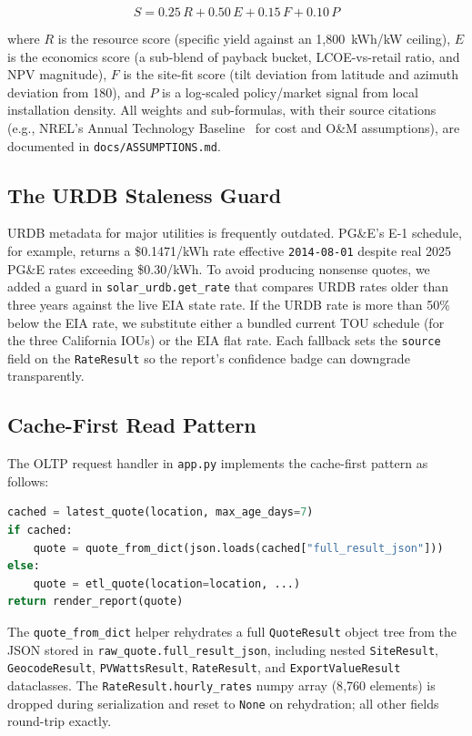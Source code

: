 \documentclass[10pt, conference]{IEEEtran}
\begin{document}
\begin{equation}
S = 0.25\,R + 0.50\,E + 0.15\,F + 0.10\,P
\end{equation}

where $R$ is the resource score (specific yield against an 1{,}800~kWh/kW ceiling), $E$ is the economics score (a sub-blend of payback bucket, LCOE-vs-retail ratio, and NPV magnitude), $F$ is the site-fit score (tilt deviation from latitude and azimuth deviation from 180\degree), and $P$ is a log-scaled policy/market signal from local installation density. All weights and sub-formulas, with their source citations (e.g., NREL's Annual Technology Baseline~\cite{NRELATB} for cost and O\&M assumptions), are documented in \texttt{docs/ASSUMPTIONS.md}.

\subsection{The URDB Staleness Guard}

URDB metadata for major utilities is frequently outdated. PG\&E's E-1 schedule, for example, returns a \$0.1471/kWh rate effective \texttt{2014-08-01} despite real 2025 PG\&E rates exceeding \$0.30/kWh. To avoid producing nonsense quotes, we added a guard in \texttt{solar\_urdb.get\_rate} that compares URDB rates older than three years against the live EIA state rate. If the URDB rate is more than 50\% below the EIA rate, we substitute either a bundled current TOU schedule (for the three California IOUs) or the EIA flat rate. Each fallback sets the \texttt{source} field on the \texttt{RateResult} so the report's confidence badge can downgrade transparently.

\subsection{Cache-First Read Pattern}

The OLTP request handler in \texttt{app.py} implements the cache-first pattern as follows:

\begin{lstlisting}[language=Python]
cached = latest_quote(location, max_age_days=7)
if cached:
    quote = quote_from_dict(json.loads(cached["full_result_json"]))
else:
    quote = etl_quote(location=location, ...)
return render_report(quote)
\end{lstlisting}

The \texttt{quote\_from\_dict} helper rehydrates a full \texttt{QuoteResult} object tree from the JSON stored in \texttt{raw\_quote.full\_result\_json}, including nested \texttt{SiteResult}, \texttt{GeocodeResult}, \texttt{PVWattsResult}, \texttt{RateResult}, and \texttt{ExportValueResult} dataclasses. The \texttt{RateResult.hourly\_rates} numpy array (8{,}760 elements) is dropped during serialization and reset to \texttt{None} on rehydration; all other fields round-trip exactly.
\end{document}
